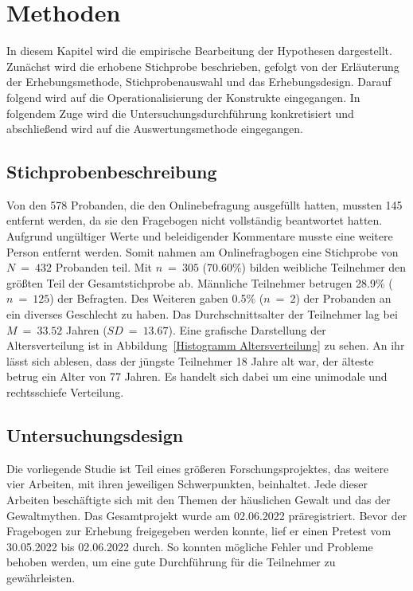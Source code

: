 \chapter{Methoden}   \label{ch_3}
In diesem Kapitel wird die empirische Bearbeitung der Hypothesen dargestellt. Zunächst wird die erhobene Stichprobe beschrieben, gefolgt von der Erläuterung der Erhebungsmethode, Stichprobenauswahl und das Erhebungsdesign. Darauf folgend wird auf die Operationalisierung der Konstrukte eingegangen. In folgendem Zuge wird die Untersuchungsdurchführung konkretisiert und abschließend wird auf die Auswertungsmethode eingegangen.

\section{Stichprobenbeschreibung} \label{sec_3.1}
Von den 578 Probanden, die den Onlinebefragung ausgefüllt hatten, mussten 145 entfernt werden, da sie den Fragebogen nicht vollständig beantwortet hatten. Aufgrund ungültiger Werte und beleidigender Kommentare musste eine weitere Person entfernt werden. Somit nahmen am Onlinefragbogen eine Stichprobe von $N~=~432$ Probanden teil. 
Mit $n~=~305$ (70.60\%) bilden weibliche Teilnehmer den größten Teil der Gesamtstichprobe ab. Männliche Teilnehmer betrugen 28.9\% ($n~=~125$) der Befragten. Des Weiteren gaben 0.5\% ($n~=~2$) der Probanden an ein diverses Geschlecht zu haben. Das Durchschnittsalter der Teilnehmer lag bei $M~=~33.52$ Jahren ($SD~=~13.67$). Eine grafische Darstellung der Altersverteilung ist in Abbildung~\ref{Histogramm Altersverteilung} zu sehen. An ihr lässt sich ablesen, dass der jüngste Teilnehmer 18 Jahre alt war, der älteste betrug ein Alter von 77 Jahren. Es handelt sich dabei um eine unimodale und rechtsschiefe Verteilung. 


\section{Untersuchungsdesign}  \label{sec_3.2}
Die vorliegende Studie ist Teil eines größeren Forschungsprojektes, das weitere vier Arbeiten, mit ihren jeweiligen Schwerpunkten, beinhaltet. Jede dieser Arbeiten beschäftigte sich mit den Themen der häuslichen Gewalt und das der Gewaltmythen. Das Gesamtprojekt wurde am 02.06.2022 präregistriert. Bevor der Fragebogen zur Erhebung freigegeben werden konnte, lief er einen Pretest vom 30.05.2022 bis 02.06.2022 durch. So konnten mögliche Fehler und Probleme behoben werden, um eine gute Durchführung für die Teilnehmer zu gewährleisten. 

